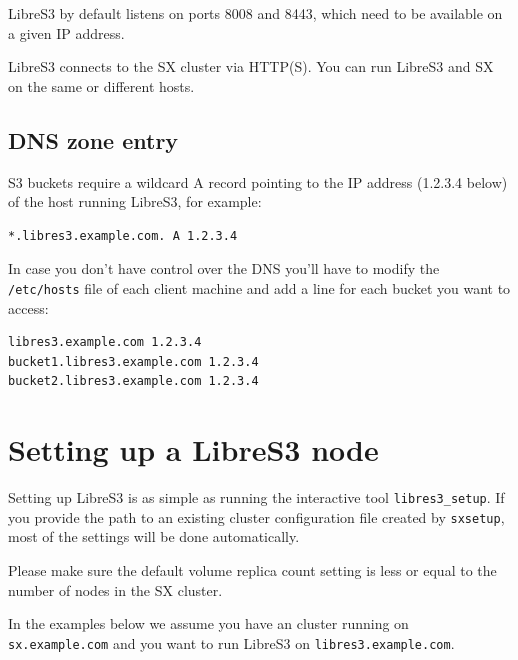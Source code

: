 LibreS3 by default listens on ports 8008 and 8443, which need to be available on a given
IP address.

LibreS3 connects to the SX cluster via HTTP(S). You can run LibreS3 and SX
on the same or different hosts.

\subsection*{DNS zone entry}

S3 buckets require a wildcard A record pointing to the IP address (1.2.3.4 below) of the
host running LibreS3, for example:
\small
\begin{lstlisting}
*.libres3.example.com. A 1.2.3.4
\end{lstlisting}
\LARGE

In case you don't have control over the DNS you'll have to modify the \verb|/etc/hosts| file
of each client machine and add a line for each bucket you want to access:
\small
\begin{lstlisting}
libres3.example.com 1.2.3.4
bucket1.libres3.example.com 1.2.3.4
bucket2.libres3.example.com 1.2.3.4
\end{lstlisting}
\LARGE

\section*{Setting up a LibreS3 node}

Setting up LibreS3 is as simple as running the interactive tool \verb+libres3_setup+.
If you provide the path to an existing \SX cluster configuration file created
by \verb+sxsetup+, most of the settings will be done automatically.

Please make sure the default volume replica count setting is less or equal
to the number of nodes in the SX cluster.

In the examples below we assume you
have an \SX cluster running on \verb|sx.example.com| and you want to run
LibreS3 on \verb|libres3.example.com|.


